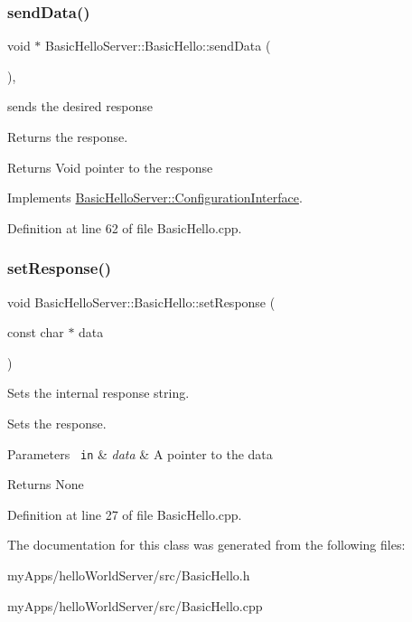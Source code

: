 \subsubsection{\texorpdfstring{sendData()}{sendData()}}
{\footnotesize\ttfamily void $\ast$ Basic\+Hello\+Server\+::\+Basic\+Hello\+::send\+Data (\begin{DoxyParamCaption}{ }\end{DoxyParamCaption})\hspace{0.3cm}{\ttfamily [override]}, {\ttfamily [virtual]}}



sends the desired response 

Returns the response.

\begin{DoxyReturn}{Returns}
Void pointer to the response 
\end{DoxyReturn}


Implements \mbox{\hyperlink{classBasicHelloServer_1_1ConfigurationInterface_aafa11e6b4a4aac078138be7ff7e5ad9c}{Basic\+Hello\+Server\+::\+Configuration\+Interface}}.



Definition at line 62 of file Basic\+Hello.\+cpp.

\mbox{\label{classBasicHelloServer_1_1BasicHello_ad0854e8076b63f77972c125cf4514de4}} 
\subsubsection{\texorpdfstring{setResponse()}{setResponse()}}
{\footnotesize\ttfamily void Basic\+Hello\+Server\+::\+Basic\+Hello\+::set\+Response (\begin{DoxyParamCaption}\item[{const char $\ast$}]{data }\end{DoxyParamCaption})}



Sets the internal response string. 

Sets the response.


\begin{DoxyParams}[1]{Parameters}
\mbox{\texttt{ in}}  & {\em data} & A pointer to the data\\
\hline
\end{DoxyParams}
\begin{DoxyReturn}{Returns}
None 
\end{DoxyReturn}


Definition at line 27 of file Basic\+Hello.\+cpp.



The documentation for this class was generated from the following files\+:\begin{DoxyCompactItemize}
\item 
my\+Apps/hello\+World\+Server/src/Basic\+Hello.\+h\item 
my\+Apps/hello\+World\+Server/src/Basic\+Hello.\+cpp\end{DoxyCompactItemize}
